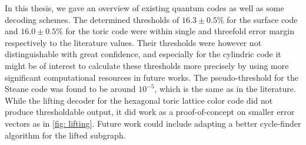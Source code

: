 In this thesis, we gave an overview of existing
quantum codes as well as some decoding schemes.
The determined thresholds of $16.3\pm 0.5 \%$ for the surface code
and $16.0\pm0.5\%$ for the toric code were within single and threefold error margin
respectively to the literature values\cite{surfaceToricThreshold}. 
Their thresholds were however not distinguishable with great confidence, 
and especially for the cylindric code it might be of interest to 
calculate these thresholds more precisely by using more significant computational
resources in future works.
The pseudo-threshold for the Steane code was found to be around $10^{-5}$, which is
the same as in the literature\cite{steaneThreshold}. 
While the lifting decoder for the hexagonal toric lattice color code did not produce
thresholdable output, it did work as a proof-of-concept on smaller error vectors as in
\ref{fig: lifting}.
Future work could include adapting a better cycle-finder algorithm for the lifted 
subgraph.